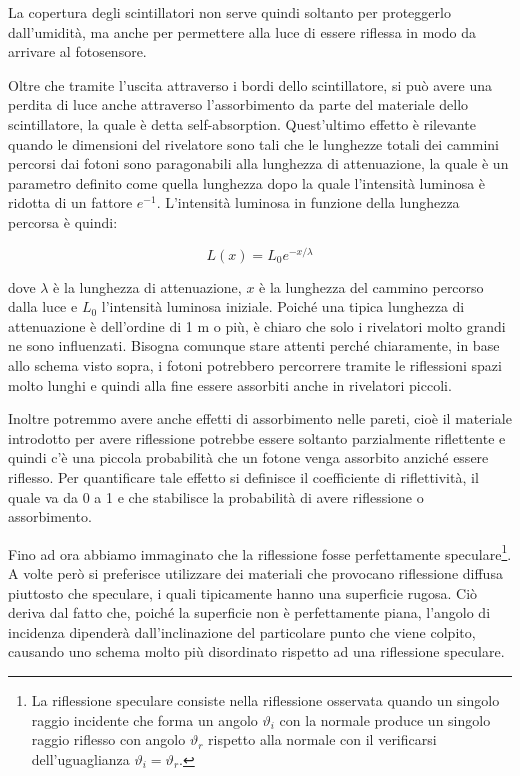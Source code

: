 La copertura degli scintillatori non serve quindi soltanto per proteggerlo dall'umidità, ma anche per permettere alla luce di essere riflessa in modo da arrivare al fotosensore.

Oltre che tramite l'uscita attraverso i bordi dello scintillatore, si può avere una perdita di luce anche attraverso l'assorbimento da parte del materiale dello scintillatore, la quale è detta self-absorption. Quest'ultimo effetto è rilevante quando le dimensioni del rivelatore sono tali che le lunghezze totali dei cammini percorsi dai fotoni sono paragonabili alla lunghezza di attenuazione, la quale è un parametro definito come quella lunghezza dopo la quale l'intensità luminosa è ridotta di un fattore $e^{-1}$. L'intensità luminosa in funzione della lunghezza percorsa è quindi:

\begin{equation*}
   L(x)=L_0 e^{-x/\lambda}
\end{equation*}

dove $\lambda$ è la lunghezza di attenuazione, $x$ è la lunghezza del cammino percorso dalla luce e $L_0$ l'intensità luminosa iniziale. Poiché una tipica lunghezza di attenuazione è dell'ordine di 1 m o più, è chiaro che solo i rivelatori molto grandi ne sono influenzati. Bisogna comunque stare attenti perché chiaramente, in base allo schema visto sopra, i fotoni potrebbero percorrere tramite le riflessioni spazi molto lunghi e quindi alla fine essere assorbiti anche in rivelatori piccoli.

Inoltre potremmo avere anche effetti di assorbimento nelle pareti, cioè il materiale introdotto per avere riflessione potrebbe essere soltanto parzialmente riflettente e quindi c'è una piccola probabilità che un fotone venga assorbito anziché essere riflesso. Per quantificare tale effetto si definisce il coefficiente di riflettività, il quale va da 0 a 1 e che stabilisce la probabilità di avere riflessione o assorbimento.%

\vspace{0.2cm}Fino ad ora abbiamo immaginato che la riflessione fosse perfettamente speculare\footnote{La riflessione speculare consiste nella riflessione osservata quando un singolo raggio incidente che forma un angolo $\vartheta_i$ con la normale produce un singolo raggio riflesso con angolo $\vartheta_r$ rispetto alla normale con il verificarsi dell'uguaglianza $\vartheta_i=\vartheta_r$.}. A volte però si preferisce utilizzare dei materiali che provocano riflessione diffusa piuttosto che speculare, i quali tipicamente hanno una superficie rugosa. Ciò deriva dal fatto che, poiché la superficie non è perfettamente piana, l'angolo di incidenza dipenderà dall'inclinazione del particolare punto che viene colpito, causando uno schema molto più disordinato rispetto ad una riflessione speculare.

